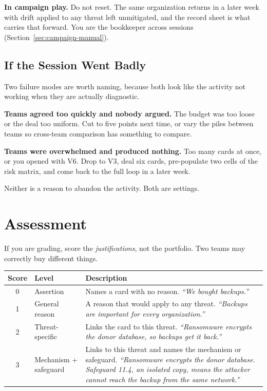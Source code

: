 \documentclass[11pt,letterpaper]{article}
\newcommand{\say}[1]{\textit{``#1''}}
\begin{document}
\textbf{In campaign play.} Do not reset. The same organization returns in a later
week with drift applied to any threat left unmitigated, and the record sheet is
what carries that forward. You are the bookkeeper across sessions
(Section~\ref{sec:campaign-manual}).

\subsection{If the Session Went Badly}

Two failure modes are worth naming, because both look like the activity not
working when they are actually diagnostic.

\textbf{Teams agreed too quickly and nobody argued.} The budget was too loose or
the deal too uniform. Cut to five points next time, or vary the piles between
teams so cross-team comparison has something to compare.

\textbf{Teams were overwhelmed and produced nothing.} Too many cards at once, or
you opened with V6. Drop to V3, deal six cards, pre-populate two cells of the
risk matrix, and come back to the full loop in a later week.

Neither is a reason to abandon the activity. Both are settings.

\section{Assessment}

If you are grading, score the \emph{justifications}, not the portfolio. Two
teams may correctly buy different things.

\begin{center}
\small
\begin{tabularx}{\textwidth}{@{}c l X@{}}
\toprule
\textbf{Score} & \textbf{Level} & \textbf{Description} \\
\midrule
0 & Assertion & Names a card with no reason. \say{We bought backups.} \\
1 & General reason & A reason that would apply to any threat. \say{Backups are
important for every organization.} \\
2 & Threat-specific & Links the card to this threat. \say{Ransomware encrypts
the donor database, so backups get it back.} \\
3 & Mechanism + safeguard & Links to this threat and names the mechanism or
safeguard. \say{Ransomware encrypts the donor database. Safeguard 11.4, an
isolated copy, means the attacker cannot reach the backup from the same
network.} \\
\bottomrule
\end{tabularx}
\end{center}
\end{document}
